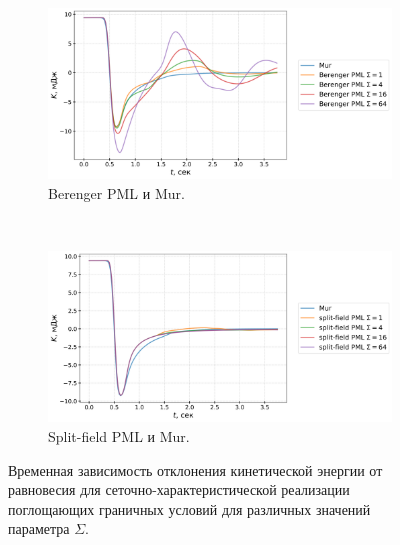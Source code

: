 \begin{figure}[htb]
\centering
    \begin{subfigure}{1.0\textwidth}
        \centering
        \includegraphics[width=1.0\textwidth]{images/pml/gcm_Berenger.png}
        \caption{Berenger PML и Mur.}
        \label{fig:gcm_berenger_pml}
    \end{subfigure}
\vspace{0.5cm}\\
    \begin{subfigure}{1.0\textwidth}
        \centering
        \includegraphics[width=1.0\textwidth]{images/pml/gcm_split-field.png}
        \caption{Split-field PML и Mur.}
        \label{fig:gcm_split_field_pml}
    \end{subfigure}
\caption{Временная зависимость отклонения кинетической энергии от равновесия для сеточно-характеристической реализации поглощающих граничных условий для различных значений параметра $\Sigma$.}
\label{fig:gcm_pml}
\end{figure}

